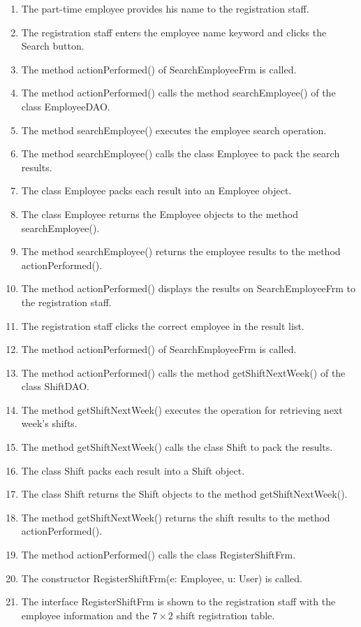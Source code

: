 \begin{enumerate}
    \item The part-time employee provides his name to the registration staff.
    \item The registration staff enters the employee name keyword and clicks the Search button.
    \item The method actionPerformed() of SearchEmployeeFrm is called.
    \item The method actionPerformed() calls the method searchEmployee() of the class EmployeeDAO.
    \item The method searchEmployee() executes the employee search operation.
    \item The method searchEmployee() calls the class Employee to pack the search results.
    \item The class Employee packs each result into an Employee object.
    \item The class Employee returns the Employee objects to the method searchEmployee().
    \item The method searchEmployee() returns the employee results to the method actionPerformed().
    \item The method actionPerformed() displays the results on SearchEmployeeFrm to the registration staff.
    \item The registration staff clicks the correct employee in the result list.
    \item The method actionPerformed() of SearchEmployeeFrm is called.
    \item The method actionPerformed() calls the method getShiftNextWeek() of the class ShiftDAO.
    \item The method getShiftNextWeek() executes the operation for retrieving next week's shifts.
    \item The method getShiftNextWeek() calls the class Shift to pack the results.
    \item The class Shift packs each result into a Shift object.
    \item The class Shift returns the Shift objects to the method getShiftNextWeek().
    \item The method getShiftNextWeek() returns the shift results to the method actionPerformed().
    \item The method actionPerformed() calls the class RegisterShiftFrm.
    \item The constructor RegisterShiftFrm(e: Employee, u: User) is called.
    \item The interface RegisterShiftFrm is shown to the registration staff with the employee information and the $7 \times 2$ shift registration table.

\end{enumerate}
